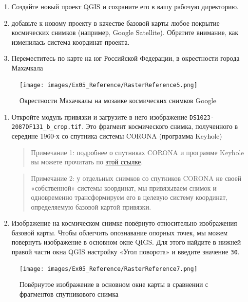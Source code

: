 \documentclass[
  12pt,
]{book}
\begin{document}
\begin{enumerate}
\def\labelenumi{\arabic{enumi}.}
\item
  Создайте новый проект QGIS и сохраните его в вашу рабочую директорию.
\item
  добавьте к новому проекту в качестве базовой карты любое покрытие космических снимков (например, Google Satellite). Обратите внимание, как изменилась система координат проекта.
\item
  Переместитесь по карте на юг Российской Федерации, в окрестности города Махачкала
\end{enumerate}

\begin{figure}
\centering
\texttt{[image: images/Ex05\_Reference/RasterReference5.png]}
\caption{Окрестности Махачкалы на мозаике космических снимков Google}
\end{figure}

\begin{enumerate}
\def\labelenumi{\arabic{enumi}.}
\setcounter{enumi}{2}
\item
  Откройте модуль привязки и загрузите в него изображение \texttt{DS1023-2087DF131\_b\_crop.tif}. Это фрагмент космического снимка, полученного в середине 1960-х со спутника системы CORONA (программа Keyhole)

  \begin{quote}
  Примечание 1: подробнее о спутниках CORONA и программе Keyhole вы можете прочитать по \href{https://www.usgs.gov/centers/eros/science/usgs-eros-archive-declassified-data-declassified-satellite-imagery-1}{этой ссылке}.
  \end{quote}

  \begin{quote}
  Примечание 2: у отдельных снимков со спутников CORONA не своей «собственной» системы координат, мы привязываем снимок и одновременно трансформируем его в целевую систему координат, определяемую базовой картой привязки.
  \end{quote}
\item
  Изображение на космическом снимке повёрнуто относительно изображения базовой карты. Чтобы облегчить опознавание опорных точек, мы можем повернуть изображение в основном окне QIGS. Для этого найдите в нижней правой части окна QGIS настройку «Угол поворота» и введите значение \texttt{30}.
\end{enumerate}

\begin{figure}
\centering
\texttt{[image: images/Ex05\_Reference/RasterReference7.png]}
\caption{Повёрнутое изображение в основном окне карты в сравнении с фрагментов спутникового снимка}
\end{figure}
\end{document}
